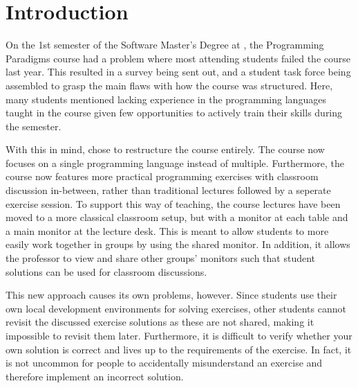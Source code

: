 \chapter{Introduction} \label{chap:introduction}
On the 1st semester of the Software Master’s Degree at \aau{}, the Programming Paradigms course had a problem where most attending students failed the course last year. 
This resulted in a survey being sent out, and a student task force being assembled to grasp the main flaws with how the course was structured. 
Here, many students mentioned lacking experience in the programming languages taught in the course given few opportunities to actively train their skills during the semester. 


With this in mind, \aau{} chose to restructure the course entirely. 
The course now focuses on a single programming language instead of multiple. 
Furthermore, the course now features more practical programming exercises with classroom discussion in-between, rather than traditional lectures followed by a seperate exercise session.
To support this way of teaching, the course lectures have been moved to a more classical classroom setup, but with a monitor at each table and a main monitor at the lecture desk. 
This is meant to allow students to more easily work together in groups by using the shared monitor.
In addition, it allows the professor to view and share other groups' monitors such that student solutions can be used for classroom discussions. 


This new approach causes its own problems, however. 
Since students use their own local development environments for solving exercises, other students cannot revisit the discussed exercise solutions as these are not shared, making it impossible to revisit them later. 
Furthermore, it is difficult to verify whether your own solution is correct and lives up to the requirements of the exercise. 
In fact, it is not uncommon for people to accidentally misunderstand an exercise and therefore implement an incorrect solution.

